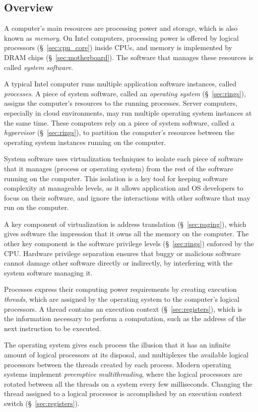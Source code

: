 \subsection{Overview}
\label{sec:background_overview}

A computer's main resources are processing power and storage, which is also
known as \textit{memory}. On Intel computers, processing power is offered by
logical processors (\S~\ref{sec:cpu_core}) inside CPUs, and memory is
implemented by DRAM chips (\S~\ref{sec:motherboard}). The software that manages
these resources is called \textit{system software}.

A typical Intel computer runs multiple application software instances, called
\textit{processes}. A piece of system software, called an
\textit{operating system} (\S~\ref{sec:rings}), assigns the computer's
resources to the running processes. Server computers, especially in cloud
environments, may run multiple operating system instances at the same time.
These computers rely on a piece of system software, called a
\textit{hypervisor} (\S~\ref{sec:rings}), to partition the computer's resources
between the operating system instances running on the computer.

System software uses virtualization techniques to isolate each piece of
software that it manages (process or operating system) from the rest of the
software running on the computer. This isolation is a key tool for keeping
software complexity at manageable levels, as it allows application and OS
developers to focus on their software, and ignore the interactions with other
software that may run on the computer.

A key component of virtualization is address translation (\S~\ref{sec:paging}),
which gives software the impression that it owns all the memory on the
computer. The other key component is the software privilege levels
(\S~\ref{sec:rings}) enforced by the CPU. Hardware privilege separation ensures
that buggy or malicious software cannot damage other software directly or
indirectly, by interfering with the system software managing it.

Processes express their computing power requirements by creating execution
\textit{threads}, which are assigned by the operating system to the computer's
logical processors. A thread contains an execution context
(\S~\ref{sec:registers}), which is the information necessary to perform a
computation, such as the address of the next instruction to be executed.

The operating system gives each process the illusion that it has an
infinite amount of logical processors at its disposal, and multiplexes the
available logical processors between the threads created by each process.
Modern operating systems implement \textit{preemptive multithreading}, where
the logical processors are rotated between all the threads on a system every
few milliseconds. Changing the thread assigned to a logical processor is
accomplished by an execution context switch (\S~\ref{sec:registers}).

